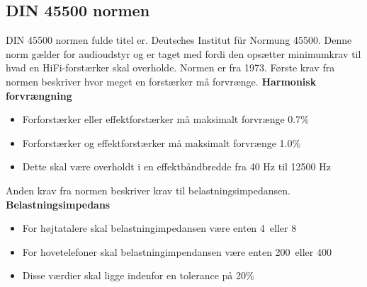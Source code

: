 \subsection*{DIN 45500 normen}
\label{DIN45500}
DIN 45500 normen fulde titel er. Deutsches Institut f\"{u}r Normung 45500. Denne norm gælder for audioudstyr og er taget med fordi den opsætter minimumkrav til hvad en HiFi-forstærker skal overholde. Normen er fra 1973. \cite{DIN45500}%
\newline
\newline
Første krav fra normen beskriver hvor meget en forstærker må forvrænge.
\newline
\newline
\textbf{Harmonisk forvrængning}
\begin{itemize}
\item Forforstærker eller effektforstærker må maksimalt forvrænge 0.7\%
\item Forforstærker og effektforstærker må maksimalt forvrænge 1.0\%
\item Dette skal være overholdt i en effektbåndbredde fra 40 Hz til 12500 Hz
\end{itemize}
Anden krav fra normen beskriver krav til belastningsimpedansen.
\newline 
\newline
\textbf{Belastningsimpedans}
\begin{itemize}
\item For højtatalere skal belastningimpedansen være enten 4\ohm~eller 8\ohm
\item For hovetelefoner skal belastningimpendansen være enten 200\ohm~eller 400\ohm
\item Disse værdier skal ligge indenfor en tolerance på 20\%
\end{itemize}